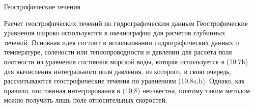 \begin{chapter}{Геострофические течения}
\begin{section}{Расчет геострофических течений по гидрографическим данным}
Геострофические уравнения широко используются в океанографии для
расчетов глубинных течений. Основная идея состоит в использовании
гидрографических данных о температуре, солености или теплопроводности
и давлении для расчета поля плотности из уравнения состояния морской
воды, которая используется в (10.7b) для вычисления интегрального поля
давления, из которого, в свою очередь, рассчитываются геострофические
течения по уравнениям (10.8a,b). Однако, как правило, постоянная
интегрирования в (10.8) неизвестна, поэтому таким методом можно
получить лишь поле относительных скоростей.
%


\end{section}
\end{chapter}
